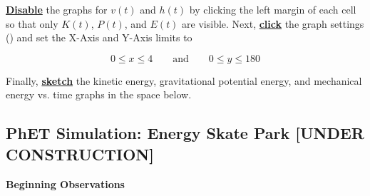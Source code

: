 \documentclass[]{exam}
\begin{document}
\begin{questions}
\begin{questions}
\bigskip

\textbf{\underline{Disable}} the graphs for $v(t)$ and $h(t)$ by clicking the left margin of each cell so that only $K(t)$, $P(t)$, and $E(t)$ are visible. Next, \textbf{\underline{click}} the graph settings (\faWrench) and set the X-Axis and Y-Axis limits to

\begin{equation*}
    0 \leq x \leq 4 \qquad \text{and} \qquad
    0 \leq y \leq 180
\end{equation*}

Finally, \textbf{\underline{sketch}} the kinetic energy, gravitational potential energy, and mechanical energy vs. time graphs in the space below.

\begin{center}
\end{center}
\end{questions}

\clearpage

\subsection*{PhET Simulation: Energy Skate Park [UNDER CONSTRUCTION]}




\textbf{Beginning Observations}

\begin{questions}


\end{questions}
\end{questions}
\end{document}
